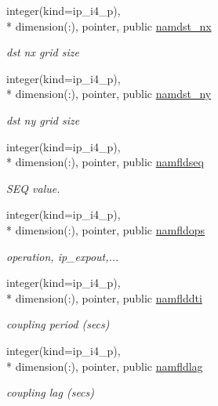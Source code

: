 \begin{DoxyCompactItemize}
integer(kind=ip\+\_\+i4\+\_\+p), \\*
dimension(\+:), pointer, public \hyperlink{classmod__oasis__namcouple_a6add94418eefdaefd78cd971888a5826}{namdst\+\_\+nx}
\begin{DoxyCompactList}\small\item\em dst nx grid size \end{DoxyCompactList}\item 
integer(kind=ip\+\_\+i4\+\_\+p), \\*
dimension(\+:), pointer, public \hyperlink{classmod__oasis__namcouple_a9035fc89396bad9574c88642d3aac5f0}{namdst\+\_\+ny}
\begin{DoxyCompactList}\small\item\em dst ny grid size \end{DoxyCompactList}\item 
integer(kind=ip\+\_\+i4\+\_\+p), \\*
dimension(\+:), pointer, public \hyperlink{classmod__oasis__namcouple_a54ccfe0380fc1c89d085f37a044a297e}{namfldseq}
\begin{DoxyCompactList}\small\item\em S\+E\+Q value. \end{DoxyCompactList}\item 
integer(kind=ip\+\_\+i4\+\_\+p), \\*
dimension(\+:), pointer, public \hyperlink{classmod__oasis__namcouple_a4841e350d91926f5f8403e73442c76ad}{namfldops}
\begin{DoxyCompactList}\small\item\em operation, ip\+\_\+expout,... \end{DoxyCompactList}\item 
integer(kind=ip\+\_\+i4\+\_\+p), \\*
dimension(\+:), pointer, public \hyperlink{classmod__oasis__namcouple_a9080617143dacb027f74c4c5158b5e58}{namflddti}
\begin{DoxyCompactList}\small\item\em coupling period (secs) \end{DoxyCompactList}\item 
integer(kind=ip\+\_\+i4\+\_\+p), \\*
dimension(\+:), pointer, public \hyperlink{classmod__oasis__namcouple_a6a4406ca14f91ef6514a18eb154e648f}{namfldlag}
\begin{DoxyCompactList}\small\item\em coupling lag (secs) \end{DoxyCompactList}\item 

\end{DoxyCompactItemize}
